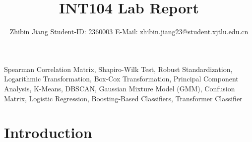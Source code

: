 \documentclass[conference]{IEEEtran}
\begin{document}
\title{INT104 Lab Report}
\author{Zhibin Jiang Student-ID: 2360003 E-Mail: zhibin.jiang23@student.xjtlu.edu.cn}
\maketitle
\begin{IEEEkeywords}
Spearman Correlation Matrix,
Shapiro-Wilk Test,
Robust Standardization,
Logarithmic Transformation,
Box-Cox Transformation,
Principal Component Analysis,
K-Means,
DBSCAN,
Gaussian Mixture Model (GMM),
Confusion Matrix,
Logistic Regression,
Boosting-Based Classifiers,
Transformer Classifier
\end{IEEEkeywords}



\section{\textbf{Introduction}}
\end{document}

